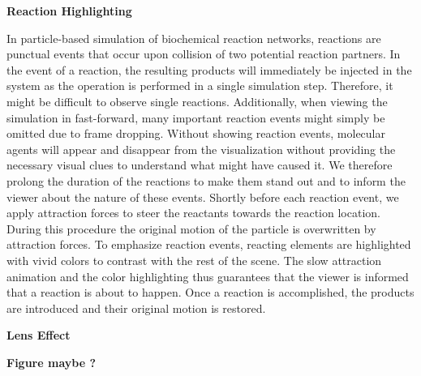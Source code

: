 \textbf{Reaction Highlighting}

In particle-based simulation of biochemical reaction networks, reactions are punctual events that occur upon collision of two potential reaction partners.
In the event of a reaction, the resulting products will immediately be injected in the system as the operation is performed in a single simulation step.
Therefore, it might be difficult to observe single reactions.
Additionally, when viewing the simulation in fast-forward, many important reaction events might simply be omitted due to frame dropping.
Without showing reaction events, molecular agents will appear and disappear from the visualization without providing the necessary visual clues to understand what might have caused it.
We therefore prolong the duration of the reactions to make them stand out and to inform the viewer about the nature of these events.
Shortly before each reaction event, we apply attraction forces to steer the reactants towards the reaction location. 
During this procedure the original motion of the particle is overwritten by attraction forces.
To emphasize reaction events, reacting elements are highlighted with vivid colors to contrast with the rest of the scene.
The slow attraction animation and the color highlighting thus guarantees that the viewer is informed that a reaction is about to happen.
Once a reaction is accomplished, the products are introduced and their original motion is restored.

\textbf{Lens Effect}

\textbf{Figure maybe ?}

